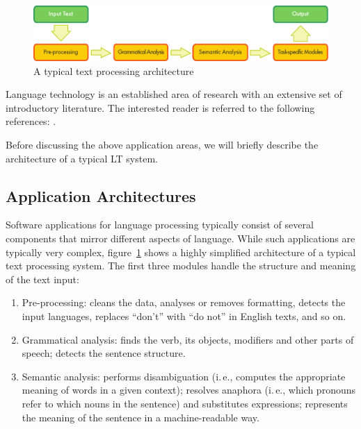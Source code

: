 \begin{multicols}{2}
\begin{figure}[b]
  \center
  \includegraphics[width=\textwidth]{../_media/english/text_processing_app_architecture}
  \caption{A typical text processing architecture}
  \label{fig:textprocessingarch_en}
\end{figure}

Language technology is an established area of research with an extensive set of introductory literature. The interested reader is referred to the following references:  \cite{jurafsky-martin01, manning-schuetze1, lt-world1, lt-survey1}.

Before discussing the above application areas, we will briefly describe the architecture of a typical LT system.

\subsection{Application Architectures}

Software applications for language processing typically consist of several components that mirror different aspects of language. While such applications are typically very complex, figure~\ref{fig:textprocessingarch_en} shows a highly simplified architecture of a typical text processing system. The first three modules handle the structure and meaning of the text input:

\begin{enumerate}
\item Pre-processing: cleans the data, analyses or removes formatting, detects the input languages, replaces ``don't'' with ``do not'' in English texts, and so on.
\item Grammatical analysis: finds the verb, its objects, modifiers and other parts of speech; detects the sentence structure.
\item Semantic analysis: performs disambiguation (i.\,e., computes the appropriate meaning of words in a given context); resolves anaphora (i.\,e., which pronouns refer to which nouns in the sentence) and substitutes expressions; represents the meaning of the sentence in a machine-readable way.
\end{enumerate}


\end{multicols}
